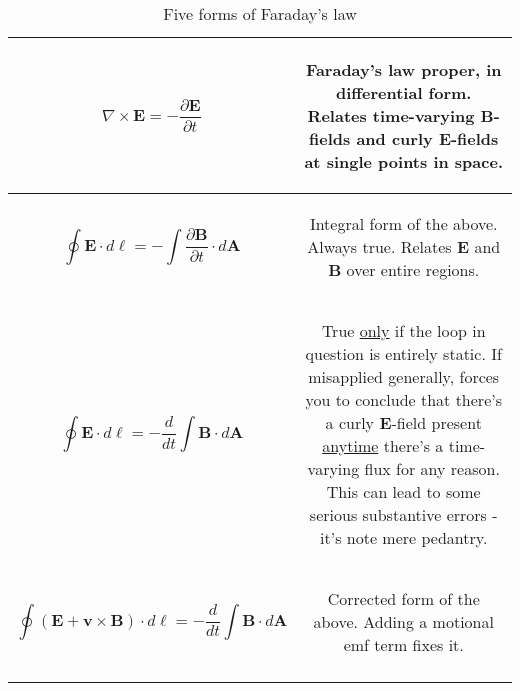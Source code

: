 \documentclass{article}
\numberwithin{equation}{section}
\begin{document}
\begin{table}[H]
\centering
{}
\caption*{Five forms of Faraday's law}
\begin{tabular}{@{}c|c@{}}
\toprule
\parbox[c]{0.3\textwidth}{\begin{equation*}
    \nabla \times \bm{E} = -\frac{\partial \bm{E}}{\partial t}
\end{equation*}} & \parbox[c]{0.5\textwidth}{\begin{center}
    Faraday's law proper, in differential form. Relates time-varying $\bm{B}$-fields and curly $\bm{E}$-fields at single points in space.
\end{center}} \\ \midrule
\parbox[c]{0.3\textwidth}{\begin{equation*}
    \oint \bm{E} \cdot d\bm{\ell} = -\int \frac{\partial \bm{B}}{\partial t} \cdot d\bm{A}
\end{equation*}} & \parbox[c]{0.5\textwidth}{\begin{center}
    Integral form of the above. Always true. Relates $\bm{E}$ and $\bm{B}$ over entire regions.
\end{center}} \\ \midrule
\parbox[c]{0.3\textwidth}{\begin{equation*}
    \oint \bm{E} \cdot d\bm{\ell} = -\frac{d}{dt} \int \bm{B} \cdot d\bm{A}
\end{equation*}} & \parbox[c]{0.5\textwidth}{\begin{center}
    True \underline{only} if the loop in question is entirely static. If misapplied generally, forces you to conclude that there's a curly $\bm{E}$-field present \underline{anytime} there's a time-varying flux for any reason. This can lead to some serious substantive errors - it's note mere pedantry.
\end{center}} \\ \midrule
\parbox[c]{0.4\textwidth}{\begin{equation*}
    \oint \left( \bm{E} + \bm{v} \times \bm{B} \right) \cdot d\bm{\ell} = -\frac{d}{dt} \int \bm{B} \cdot d\bm{A}
\end{equation*}} & \parbox[c]{0.5\textwidth}{\begin{center}
    Corrected form of the above. Adding a motional emf term fixes it.
\end{center}} \\ \midrule
\parbox[c]{0.3\textwidth}{\begin{equation*}

\end{equation*}}
\end{tabular}
\end{table}
\end{document}
